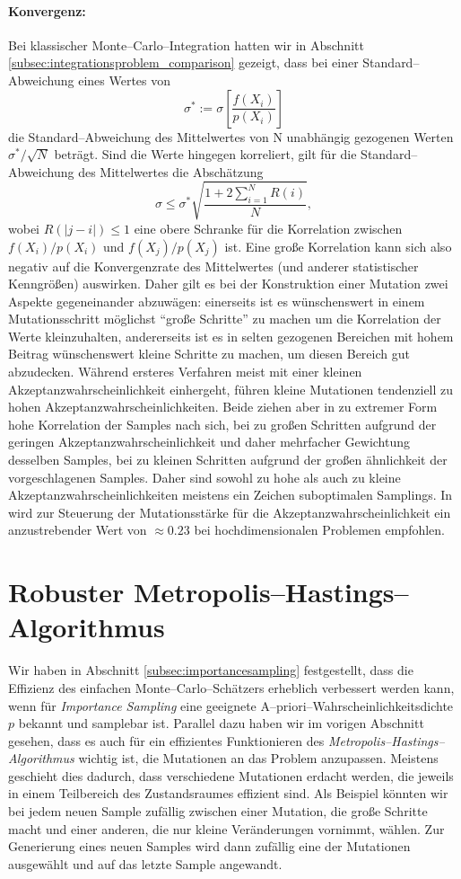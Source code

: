 	\paragraph{Konvergenz:}Bei klassischer Monte--Carlo--Integration hatten wir in Abschnitt \ref{subsec:integrationsproblem_comparison} gezeigt, dass bei einer Standard--Abweichung eines Wertes von $$\sigma^*:=\sigma\left[\frac{f(X_i)}{p(X_i)}\right]$$ die Standard--Abweichung des Mittelwertes von N unabhängig gezogenen Werten $\sigma^*/\sqrt{N}$ beträgt. Sind die Werte hingegen korreliert, gilt für die Standard--Abweichung des Mittelwertes die Abschätzung \citep[siehe][VII.\;\S3(8)]{Renyi:1964p10655}
	$$\sigma\leq \sigma^*\sqrt{\frac{1+2\sum_{i=1}^N R(i)}{N}},$$
	wobei $R(|j-i|)\leq 1$ eine obere Schranke für die Korrelation zwischen $f(X_i)/p(X_i)$ und $f(X_j)/p(X_j)$ ist.
	Eine große Korrelation kann sich also negativ auf die Konvergenzrate des Mittelwertes (und anderer statistischer Kenngrößen) auswirken. Daher gilt es bei der Konstruktion einer Mutation zwei Aspekte gegeneinander abzuwägen: einerseits ist es wünschenswert in einem Mutationsschritt möglichst ``große Schritte'' zu machen um die Korrelation der Werte kleinzuhalten, andererseits ist es in selten gezogenen Bereichen mit hohem Beitrag wünschenswert kleine Schritte zu machen, um diesen Bereich gut abzudecken. Während ersteres Verfahren meist mit einer kleinen Akzeptanzwahrscheinlichkeit einhergeht, führen kleine Mutationen tendenziell zu hohen Akzeptanzwahrscheinlichkeiten. Beide ziehen aber in zu extremer Form hohe Korrelation der Samples nach sich, bei zu großen Schritten aufgrund der geringen Akzeptanzwahrscheinlichkeit und daher mehrfacher Gewichtung desselben Samples, bei zu kleinen Schritten aufgrund der großen ähnlichkeit der vorgeschlagenen Samples. Daher sind sowohl zu hohe als auch zu kleine Akzeptanzwahrscheinlichkeiten meistens ein Zeichen suboptimalen Samplings. In \citep{Roberts:1997p5198} wird zur Steuerung der Mutationsstärke für die Akzeptanzwahrscheinlichkeit ein anzustrebender Wert von $\approx 0.23$ bei hochdimensionalen Problemen empfohlen.

	
	
	\section{Robuster Metropolis--Hastings--Algorithmus}
	Wir haben in Abschnitt \ref{subsec:importancesampling} festgestellt, dass die Effizienz des einfachen Monte--Carlo--Schätzers erheblich verbessert werden kann, wenn für {\em Importance Sampling} eine geeignete A--priori--Wahrscheinlichkeitsdichte $p$ bekannt und samplebar ist. Parallel dazu haben wir im vorigen Abschnitt gesehen, dass es auch für ein effizientes Funktionieren des {\em Metropolis--Hastings--Algorithmus} wichtig ist, die Mutationen an das Problem anzupassen. Meistens geschieht dies dadurch, dass verschiedene Mutationen erdacht werden, die jeweils in einem Teilbereich des Zustandsraumes effizient sind. Als Beispiel könnten wir bei jedem neuen Sample zufällig zwischen einer Mutation, die große Schritte macht und einer anderen, die nur kleine Veränderungen vornimmt, wählen. Zur Generierung eines neuen Samples wird dann zufällig eine der Mutationen ausgewählt und auf das letzte Sample angewandt.
	
